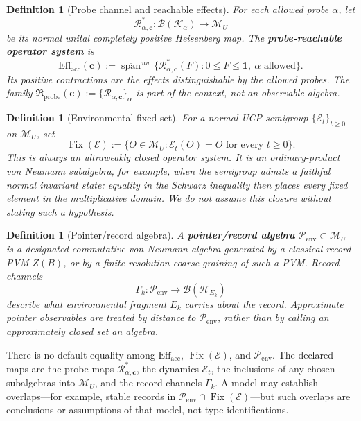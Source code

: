 \documentclass[12pt,a4paper]{article}
\newtheorem{definition}[theorem]{Definition}
\begin{document}
\begin{definition}[Probe channel and reachable effects]
\label{def:probe-effects}
For each allowed probe $\alpha$, let
\[
\mathcal R_{\alpha,\mathbf c}^{*}:\mathcal B(\mathcal K_\alpha)\longrightarrow\mathcal M_U
\]
be its normal unital completely positive Heisenberg map.  The \textbf{probe-reachable operator system} is
\[
\mathrm{Eff}_{\mathrm{acc}}(\mathbf c)
:=\overline{\operatorname{span}}^{\,uw}
\{\mathcal R_{\alpha,\mathbf c}^{*}(F):0\le F\le\mathbf 1,
\ \alpha\text{ allowed}\}.
\]
Its positive contractions are the effects distinguishable by the allowed probes.  The family $\mathfrak R_{\mathrm{probe}}(\mathbf c):=\{\mathcal R_{\alpha,\mathbf c}\}_\alpha$ is part of the context, not an observable algebra.
\end{definition}

\begin{definition}[Environmental fixed set]
\label{def:fixed-set}
For a normal UCP semigroup $\{\mathcal E_t\}_{t\ge0}$ on $\mathcal M_U$, set
\[
\operatorname{Fix}(\mathcal E)
:=\{O\in\mathcal M_U:\mathcal E_t(O)=O\text{ for every }t\ge0\}.
\]
This is always an ultraweakly closed operator system.  It is an ordinary-product von Neumann subalgebra, for example, when the semigroup admits a faithful normal invariant state: equality in the Schwarz inequality then places every fixed element in the multiplicative domain.  We do not assume this closure without stating such a hypothesis.
\end{definition}

\begin{definition}[Pointer/record algebra]
\label{def:pointer-algebra}
A \textbf{pointer/record algebra} $\mathcal P_{\mathrm{env}}\subset\mathcal M_U$ is a designated commutative von Neumann algebra generated by a classical record PVM $Z(B)$, or by a finite-resolution coarse graining of such a PVM.  Record channels
\[
\Gamma_k:\mathcal P_{\mathrm{env}}\longrightarrow\mathcal B(\mathcal H_{E_k})
\]
describe what environmental fragment $E_k$ carries about the record.  Approximate pointer observables are treated by distance to $\mathcal P_{\mathrm{env}}$, rather than by calling an approximately closed set an algebra.
\end{definition}

There is no default equality among $\mathrm{Eff}_{\mathrm{acc}}$, $\operatorname{Fix}(\mathcal E)$, and $\mathcal P_{\mathrm{env}}$.  The declared maps are the probe maps $\mathcal R_{\alpha,\mathbf c}^{*}$, the dynamics $\mathcal E_t$, the inclusions of any chosen subalgebras into $\mathcal M_U$, and the record channels $\Gamma_k$.  A model may establish overlaps---for example, stable records in $\mathcal P_{\mathrm{env}}\cap\operatorname{Fix}(\mathcal E)$---but such overlaps are conclusions or assumptions of that model, not type identifications.
\end{document}
